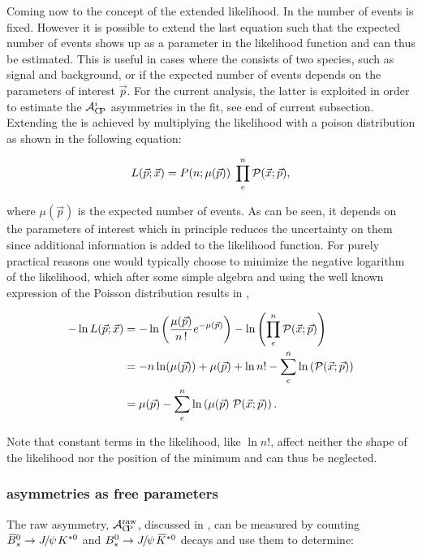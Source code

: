 Coming now to the concept of the extended likelihood. In  the number of events is fixed. However it is possible to
extend the last equation such that the expected number of events shows up as a parameter in the likelihood function and can thus be estimated.
This is useful in cases where the \pdf consists of two species, such as signal and background, or if the expected number of events depends on the
parameters of interest $\vec{p}$. For the current analysis, the latter is exploited in order to estimate the $\mathcal{A}_{\rm C\!P}^{i}$ asymmetries in the fit,
see end of current subsection. Extending the \pdf is achieved by multiplying the likelihood with a poison distribution as shown in the following equation:

\begin{equation}
  \centering
L(\vec{p};\vec{x}) = P(n;\expEvnts) \; \prod_e^n \mathcal{P}(\vec{x};\vec{p}),
\label{extlikelihood}
\end{equation}

\noindent where $\mu(\vec{p})$ is the expected number of events. As can be seen, it depends on the parameters of interest which in
principle reduces the uncertainty on them since additional information is added to the likelihood function.
For purely practical reasons one would typically choose to minimize the negative logarithm of the likelihood, which after some simple
algebra and using the well known expression of the Poisson distribution results in ,

\begin{align}
  \centering
  -\nll &= -\ln\left( \frac{\expEvnts}{n\,!} e^{-\expEvnts } \right) - \ln\left( \prod_e^n \mathcal{P}(\vec{x};\vec{p}) \right)  \nonumber \\
        &= - n\ln(\expEvnts) + \expEvnts  + \ln n! - \sum_e^n \ln\parenthesis{\mathcal{P}(\vec{x};\vec{p})} \nonumber \\
        &=  \expEvnts  - \sum_e^n \ln\parenthesis{\expEvnts \; \mathcal{P}(\vec{x};\vec{p}) }.
\label{extloglikelihood}
\end{align}

\noindent Note that constant terms in the likelihood, like $\ln n!$, affect neither the shape of the likelihood nor the position of the minimum
and can thus be neglected.

\subsubsection{\CP asymmetries as free parameters}
\label{cp_assymetries_and_total_decay_rate}
The raw asymmetry, $\mathcal{A}_{\rm C\!P}^{\rm raw}$, discussed in , can be measured by counting
$\BsbarJpsiKst$ and $\BsJpsiKst$ decays and use them to determine:

